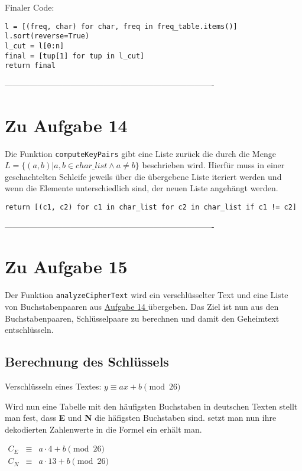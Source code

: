 \documentclass[12pt]{article}
\begin{document}
Finaler Code:
\begin{lstlisting}
l = [(freq, char) for char, freq in freq_table.items()]
l.sort(reverse=True)
l_cut = l[0:n]
final = [tup[1] for tup in l_cut]
return final   
\end{lstlisting}
 
 
%
 ----------------------------------------------------------------------------
\section{Zu Aufgabe 14}

Die Funktion \texttt{computeKeyPairs} gibt eine Liste zurück die durch die Menge $L =\{(a,b) \vert a, b \in char\_list \land a \neq b\}$ beschrieben wird. Hierfür muss in einer geschachtelten Schleife jeweils über die übergebene Liste iteriert werden und wenn die Elemente unterschiedlich sind, der neuen Liste angehängt werden.

\begin{lstlisting}
return [(c1, c2) for c1 in char_list for c2 in char_list if c1 != c2]
\end{lstlisting}

%
 ----------------------------------------------------------------------------
\section{Zu Aufgabe 15}

Der Funktion \texttt{analyzeCipherText} wird ein verschlüsselter Text und eine Liste von Buchstabenpaaren aus \hyperref[sec:aufgabe_14]{Aufgabe 14 } übergeben. Das Ziel ist nun aus den Buchstabenpaaren, Schlüsselpaare zu berechnen und damit den Geheimtext entschlüsseln.

\subsection{Berechnung des Schlüssels}
\label{subsec:aufgabe_15_1}
Verschlüsseln eines Textes:
$y \equiv ax + b \pmod{26}$

Wird nun eine Tabelle mit den häufigsten Buchstaben in deutschen Texten stellt man fest, dass \textbf{E} und \textbf{N} die häfigsten Buchstaben sind. setzt man nun ihre dekodierten Zahlenwerte in die Formel ein erhält man.

$
\begin{array}{lcl} 
C_E & \equiv & a \cdot 4 + b \pmod{26}\\
C_N & \equiv & a \cdot 13 + b \pmod{26} \end{array}
$
\end{document}
